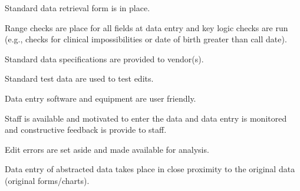 \begin{QandA}
    \item Standard data retrieval form is in place.
    \begin{answered}
        
    \end{answered}

    \item Range checks are place for all fields at data entry and key logic checks are run (e.g., checks for clinical impossibilities or date of birth greater than call date).    
    \begin{answered}
        
    \end{answered}

    \item Standard data specifications are provided to vendor(s).
    \begin{answered}
        
    \end{answered}

    \item Standard test data are used to test edits.
    \begin{answered}
        
    \end{answered}

    \item Data entry software and equipment are user friendly.
    \begin{answered}
        
    \end{answered}

    \item Staff is available and motivated to enter the data and data entry is monitored and constructive feedback is provide to staff.
    \begin{answered}
        
    \end{answered}

    \item Edit errors are set aside and made available for analysis.
    \begin{answered}
        
    \end{answered}

    \item Data entry of abstracted data takes place in close proximity to the original data (original forms/charts).
    \begin{answered}
        

\end{answered}
\end{QandA}
